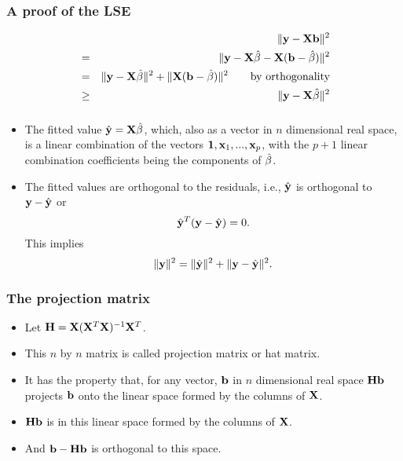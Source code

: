 \documentclass{beamer}
\def\bfX{{\bf X}}
\begin{document}
      \begin{frame}
      	\frametitle{  A proof of the LSE}
      	
      	\begin{eqnarray*}
      		&  & \| {\bf y} - {\bf X} {\bf b} \|^2 \\
      		&=  &
      		\| {\bf y} - {\bf X} {\hat {\bf \beta}} - {\bf X} ( {\bf b}- {\hat {\bf \beta}}) \|^2
      		\\
      		&= & \| {\bf y} - {\bf X} {\hat {\bf \beta}}\|^2
      		+\|  {\bf X} ( {\bf b}- {\hat {\bf \beta}}) \|^2 \qquad \hbox{by orthogonality}
      		\\
      		&\geq & \| {\bf y} - {\bf X} {\hat {\bf \beta}}\|^2
      	\end{eqnarray*}
      \end{frame}
      
      
      
      \begin{frame}
      	\frametitle{ }
      	\begin{itemize}
      		\item 
      		The fitted value $  \hat {\bf y } = {\bf X} {\hat {\bf \beta}}$, which, also
      		as a vector in $n$ dimensional real space, is a linear combination of the
      		vectors ${\bf 1}, {\bf x}_1, ..., {\bf x}_p$, with the $p+1$ linear combination coefficients being
      		the components of $\hat {\bf \beta}$. 
      		
      		\item
      		The fitted values are orthogonal to the residuals, i.e.,
      		$\hat {\bf y }$ is orthogonal to ${\bf y } - \hat {\bf y}$ or
      		$$\hat {\bf y }^T ( {\bf y } - \hat {\bf y} ) =0.$$
      		This implies
      		$$\|{\bf y} \|^2 = \|\hat {\bf y}\|^2 + \| {\bf y} -\hat { \bf y} \|^2.$$
      	\end{itemize}
      \end{frame}
      
      
      \begin{frame}
      	\frametitle{The projection matrix}
      	
      	\begin{itemize}
      		\item 
      		Let ${\bf H} = {\bf X} ( { \bf X}^T {\bf X} )^{-1} \bfX^T$.
      		\item This $n$ by $n$ matrix is called projection matrix or hat  matrix.
      		\item It has the property that, for any vector, ${\bf b}$ in $n$ dimensional real space
      		${\bf H} {\bf b}$ projects ${\bf b}$ onto the linear space formed by the columns of ${\bf X}$.
      		\item
      		${\bf H} {\bf b} $  is in this linear space formed by the columns of ${\bf X}$.
      		\item
      		And ${\bf b} - {\bf H} { \bf b}$ is orthogonal to this space.
      	\end{itemize}
      \end{frame}
      
\end{document}
